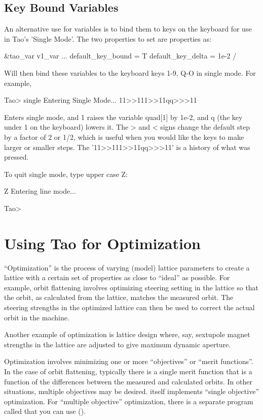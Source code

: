 \documentclass{hitec}
\newcommand{\Section}[1]{\section{#1}\vspace*{-1ex}}
\begin{document}
\subsection{Key Bound Variables}


An alternative use for variables is to bind them to keys on the keyboard for use in Tao's 'Single
Mode'. The two properties to set are %
properties as:
\begin{code}
&tao_var
  v1_var%
  ...
  default_key_bound = T
  default_key_delta = 1e-2
/
\end{code}

Will then bind these variables to the keyboard keys 1-9, Q-O in single mode. For example,

\begin{code}
Tao> single
Entering Single Mode...
11>>111>>11qq>>>11
\end{code}

Enters single mode, and 1 raises the variable quad[1] by 1e-2, and q (the key under 1 on the
keyboard) lowers it. The > and < signs change the default step by a factor of 2 or 1/2, which is
useful when you would like the keys to make larger or smaller steps. The '11>>111>>11qq>>>11' is a
history of what was pressed.

To quit single mode, type upper case Z:
\begin{code}
Z
Entering line mode...
    
Tao> 
\end{code}


\Section{Using Tao for Optimization}
\label{s:optimization}

``Optimization'' is the process of varying (model) lattice parameters to create a lattice with a
certain set of properties as close to ``ideal'' as possible. For example, orbit flattening involves
optimizing steering setting in the lattice so that the orbit, as calculated from the lattice,
matches the measured orbit. The steering strengths in the optimized lattice can then be used to
correct the actual orbit in the machine.

Another example of optimization is lattice design where, say, sextupole magnet strengths in the
lattice are adjusted to give maximum dynamic aperture.

Optimization involves minimizing one or more ``objectives'' or ``merit functions''. In the case of
orbit flattening, typically there is a single merit function that is a function of the differences
between the measured and calculated orbits. In other situations, multiple objectives may
be desired. \tao itself implements ``single objective'' optimization. For ``multiple objective''
optimization, there is a separate program called  that you can use ().
\end{document}
